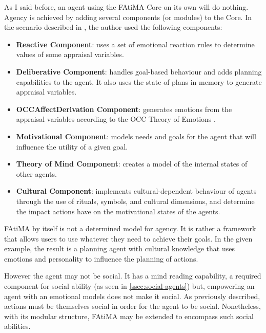 As I said before, an agent using the \ac{FAtiMA} Core on its own will do nothing.
Agency is achieved by adding several components (or modules) to the Core.
In the scenario described in \cite{mascarenhas:cultural-behaviour}, the author used the following components:

\begin{itemize}
\item \textbf{Reactive Component}: uses a set of emotional reaction rules to determine values of some appraisal variables.
\item \textbf{Deliberative Component}: handles goal-based behaviour and adds planning capabilities to the agent. It also uses the state of plans in memory to generate appraisal variables.
\item \textbf{OCCAffectDerivation Component}: generates emotions from the appraisal variables according to the OCC Theory of Emotions \cite{ortony:occ}.
\item \textbf{Motivational Component}: models needs and goals for the agent that will influence the utility of a given goal.
\item \textbf{Theory of Mind Component}: creates a model of the internal states of other agents.
\item \textbf{Cultural Component}: implements cultural-dependent behaviour of agents through the use of rituals, symbols, and cultural dimensions, and determine the impact actions have on the motivational states of the agents.
\end{itemize}

\ac{FAtiMA} by itself is not a determined model for agency.
It is rather a framework that allows users to use whatever they need to achieve their goals.
In the given example, the result is a planning agent with cultural knowledge that uses emotions and personality to influence the planning of actions.

However the agent may not be social.
It has a mind reading capability, a required component for social ability (as seen in \ref{ssec:social-agents}) but, empowering an agent with an emotional models does not make it social.
As previously described, actions must be themselves social in order for the agent to be social. 
Nonetheless, with its modular structure, \ac{FAtiMA} may be extended to encompass such social abilities.